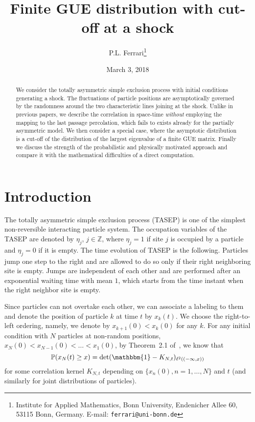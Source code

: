 \documentclass[12pt,a4paper]{article}
\title{Finite GUE distribution with cut-off at a shock}
\author{P.L. Ferrari\thanks{Institute for Applied Mathematics, Bonn University, Endenicher Allee 60, 53115 Bonn, Germany. E-mail: {\tt ferrari@uni-bonn.de}}}
\date{March 3, 2018}
\numberwithin{equation}{section}
\newcommand{\Pb}{\mathbb{P}}
\newcommand{\Id}{\mathbbm{1}}
\newcommand{\Z}{\mathbb{Z}}
\begin{document}
\sloppy
\maketitle

\begin{abstract}
We consider the totally asymmetric simple exclusion process with initial conditions generating a shock. The fluctuations of particle positions are asymptotically governed by the randomness around the two characteristic lines joining at the shock. Unlike in previous papers, we describe the correlation in space-time \emph{without} employing the mapping to the last passage percolation, which fails to exists already for the partially asymmetric model. We then consider a special case, where the asymptotic distribution is a cut-off of the distribution of the largest eigenvalue of a finite GUE matrix. Finally we discuss the strength of the probabilistic and physically motivated approach and compare it with the mathematical difficulties of a direct computation.
\end{abstract}

\section{Introduction}\label{sectIntro}
The totally asymmetric simple exclusion process (TASEP) is one of the simplest non-reversible interacting particle system. The occupation variables of the TASEP are denoted by $\eta_j$, $j\in\Z$, where $\eta_j=1$ if site $j$ is occupied by a particle and $\eta_j=0$ if it is empty. The time evolution of  TASEP is the following. Particles jump one step to the right and are allowed to do so only if their right neighboring site is empty. Jumps are independent of each other and are performed after an exponential waiting time with mean $1$, which starts from the time instant when the right neighbor site is empty.

Since particles can not overtake each other, we can associate a labeling to them and denote the position of particle $k$ at time $t$ by $x_k(t)$. We choose the right-to-left ordering, namely, we denote by $x_{k+1}(0)< x_k(0)$ for any $k$. For any initial condition with $N$ particles at non-random positions, $x_N(0)<x_{N-1}(0)<\ldots<x_1(0)$, by Theorem~2.1 of~\cite{BFPS06}, we know that
\begin{equation}\label{eq1}
\Pb(x_N(t)\geq x)=\det(\Id-K_{N,t})_{\ell^2((-\infty,x))}
\end{equation}
for some correlation kernel $K_{N,t}$ depending on $\{x_n(0),n=1,\ldots,N\}$ and $t$ (and similarly for joint distributions of particles).
\end{document}
